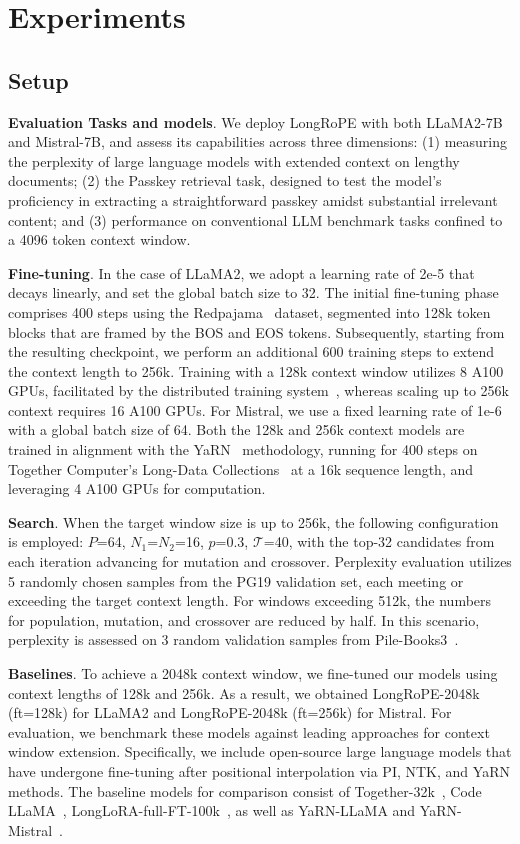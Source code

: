  \section{Experiments}

\label{sec:exp}
\subsection{Setup}
\textbf{Evaluation Tasks and models}. We deploy LongRoPE with both LLaMA2-7B and Mistral-7B, and assess its capabilities across three dimensions: (1) measuring the perplexity of large language models with extended context on lengthy documents; (2) the Passkey retrieval task, designed to test the model’s proficiency in extracting a straightforward passkey amidst substantial irrelevant content; and (3) performance on conventional LLM benchmark tasks confined to a 4096 token context window.

\textbf{Fine-tuning}. In the case of LLaMA2, we adopt a learning rate of 2e-5 that decays linearly, and set the global batch size to 32. The initial fine-tuning phase comprises 400 steps using the Redpajama~\cite{redpajama} dataset, segmented into 128k token blocks that are framed by the BOS and EOS tokens. Subsequently, starting from the resulting checkpoint, we perform an additional 600 training steps to extend the context length to 256k. Training with a 128k context window utilizes 8 A100 GPUs, facilitated by the distributed training system~\cite{cube}, whereas scaling up to 256k context requires 16 A100 GPUs. For Mistral, we use a fixed learning rate of 1e-6 with a global batch size of 64. Both the 128k and 256k context models are trained in alignment with the YaRN~\cite{yarn} methodology, running for 400 steps on Together Computer's Long-Data Collections~\cite{mistraldata} at a 16k sequence length, and leveraging 4 A100 GPUs for computation.

\textbf{Search}. When the target window size is up to 256k, the following configuration is employed: $P$=64, $N_1$=$N_2$=16, $p$=0.3, $\mathcal{T}$=40, with the top-32 candidates from each iteration advancing for mutation and crossover. Perplexity evaluation utilizes 5 randomly chosen samples from the PG19 validation set, each meeting or exceeding the target context length. For windows exceeding 512k, the numbers for population, mutation, and crossover are reduced by half. In this scenario, perplexity is assessed on 3 random validation samples from Pile-Books3~\cite{pile}.

\textbf{Baselines}. To achieve a 2048k context window, we fine-tuned our models using context lengths of 128k and 256k. As a result, we obtained LongRoPE-2048k (ft=128k) for LLaMA2 and LongRoPE-2048k (ft=256k) for Mistral. For evaluation, we benchmark these models against leading approaches for context window extension. Specifically, we include open-source large language models that have undergone fine-tuning after positional interpolation via PI, NTK, and YaRN methods. The baseline models for comparison consist of Together-32k~\cite{together}, Code LLaMA~\cite{codellama}, LongLoRA-full-FT-100k~\cite{longlora}, as well as YaRN-LLaMA and YaRN-Mistral~\cite{yarn}.

